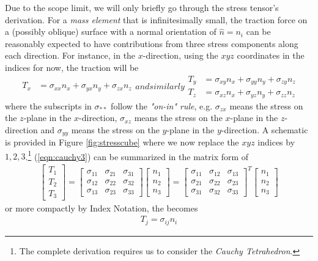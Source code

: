 Due to the scope limit, we will only briefly go through the stress tensor's derivation. For a \textit{mass element} that is infinitesimally small, the traction force on a (possibly oblique) surface with a normal orientation of $\hat{n} = n_i$ can be reasonably expected to have contributions from three stress components along each direction. For instance, in the $x$-direction, using the $xyz$ coordinates in the indices for now, the traction will be
\begin{subequations}
\label{eqn:cauchy3}
\begin{align}
T_x &= \sigma_{xx}n_x + \sigma_{yx}n_y + \sigma_{zx}n_z
\end{align}
and similarly
\begin{align}
T_y &= \sigma_{xy}n_x + \sigma_{yy}n_y + \sigma_{zy}n_z \\
T_z &= \sigma_{xz}n_x + \sigma_{yz}n_y + \sigma_{zz}n_z 
\end{align}
\end{subequations}
where the subscripts in $\sigma_{**}$ follow the \textit{"on-in" rule}, e.g. $\sigma_{zx}$ means the stress on the $z$-plane in the $x$-direction, $\sigma_{xz}$ means the stress on the $x$-plane in the $z$-direction and $\sigma_{yy}$ means the stress on the $y$-plane in the $y$-direction. A schematic is provided in Figure \ref{fig:stresscube} where we now replace the $xyz$ indices by $1,2,3$.\footnote{The complete derivation requires us to consider the \textit{Cauchy Tetrahedron}.} (\ref{eqn:cauchy3}) can be summarized in the matrix form of
\begin{align}
\begin{bmatrix}
T_1 \\
T_2 \\
T_3
\end{bmatrix}  
=
\begin{bmatrix}
\sigma_{11} & \sigma_{21} & \sigma_{31} \\
\sigma_{12} & \sigma_{22} & \sigma_{32} \\
\sigma_{13} & \sigma_{23} & \sigma_{33}
\end{bmatrix}
\begin{bmatrix}
n_1 \\
n_2 \\
n_3
\end{bmatrix}
=
\begin{bmatrix}
\sigma_{11} & \sigma_{12} & \sigma_{13} \\
\sigma_{21} & \sigma_{22} & \sigma_{23} \\
\sigma_{31} & \sigma_{32} & \sigma_{33}
\end{bmatrix}^T
\begin{bmatrix}
n_1 \\
n_2 \\
n_3
\end{bmatrix}
\label{eqn:cauchyT}
\end{align}
or more compactly by Index Notation, the  becomes
\begin{align}
T_j = \sigma_{ij}n_i \label{eqn:Cauchyform}
\end{align}

